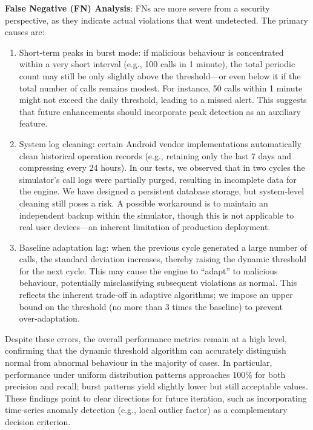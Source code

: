 \textbf{False Negative (FN) Analysis}: FNs are more severe from a security perspective, as they indicate actual violations that went undetected. The primary causes are:
\begin{enumerate}
    \item Short‑term peaks in burst mode: if malicious behaviour is concentrated within a very short interval (e.g., 100 calls in 1 minute), the total periodic count may still be only slightly above the threshold—or even below it if the total number of calls remains modest. For instance, 50 calls within 1 minute might not exceed the daily threshold, leading to a missed alert. This suggests that future enhancements should incorporate peak detection as an auxiliary feature.
    \item System log cleaning: certain Android vendor implementations automatically clean historical operation records (e.g., retaining only the last 7 days and compressing every 24 hours). In our tests, we observed that in two cycles the simulator's call logs were partially purged, resulting in incomplete data for the engine. We have designed a persistent database storage, but system‑level cleaning still poses a risk. A possible workaround is to maintain an independent backup within the simulator, though this is not applicable to real user devices—an inherent limitation of production deployment.
    \item Baseline adaptation lag: when the previous cycle generated a large number of calls, the standard deviation increases, thereby raising the dynamic threshold for the next cycle. This may cause the engine to “adapt” to malicious behaviour, potentially misclassifying subsequent violations as normal. This reflects the inherent trade‑off in adaptive algorithms; we impose an upper bound on the threshold (no more than 3 times the baseline) to prevent over‑adaptation.
\end{enumerate}

Despite these errors, the overall performance metrics remain at a high level, confirming that the dynamic threshold algorithm can accurately distinguish normal from abnormal behaviour in the majority of cases. In particular, performance under uniform distribution patterns approaches 100\% for both precision and recall; burst patterns yield slightly lower but still acceptable values. These findings point to clear directions for future iteration, such as incorporating time‑series anomaly detection (e.g., local outlier factor) as a complementary decision criterion.

